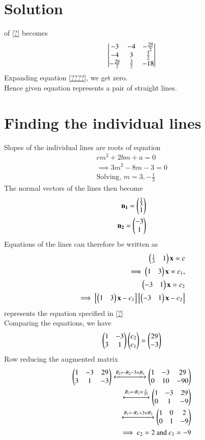 \documentclass[journal,12pt,twocolumn]{IEEEtran}
\begin{document}
\section{Solution}
 of \ref{?} becomes
\begin{align}
    \begin{vmatrix}-3&-4&-\frac{29}{2}\\-4&3&\frac{3}{2}\\-\frac{29}{2}&\frac{3}{2}&-18\end{vmatrix}\label{????}
\end{align}
Expanding equation \ref{????}, we get zero.\\
Hence given equation represents a pair of straight lines.
\section{Finding the individual lines}
Slopes of the individual lines are roots of equation 
\begin{align}
    cm^2+2bm+a=0\\
    \implies 3m^2-8m-3=0\\
    \text{Solving, }m=3,-\frac{1}{3}
\end{align}
The normal vectors of the lines then become
\begin{align}
    \mathbf{n_1}=\begin{pmatrix}\frac{1}{3}\\1\end{pmatrix}\\
    \mathbf{n_2}=\begin{pmatrix}-3\\1\end{pmatrix}
\end{align}
Equations of the lines can therefore be written as
\begin{align}
  \begin{pmatrix}\frac{1}{3}&1\end{pmatrix}\mathbf{x}=c\\
 \implies \begin{pmatrix}1&3\end{pmatrix}\mathbf{x}=c_1 ,\\
   \begin{pmatrix}-3&1\end{pmatrix}\mathbf{x}=c_2\\
  \implies \left[\begin{pmatrix}1&3\end{pmatrix}\mathbf{x}-c_1\right]\left[\begin{pmatrix}-3&1\end{pmatrix}\mathbf{x}-c_2\right]
\end{align}
represents the equation specified in \ref{?}\\
Comparing the equations, we have
\begin{align}
    \begin{pmatrix}1&-3\\3&1\end{pmatrix}\begin{pmatrix}c_2\\c_1\end{pmatrix}=\begin{pmatrix}29\\-3\end{pmatrix}\\
 \end{align}
 Row reducing the augmented matrix
 \begin{align}
    \begin{pmatrix}1&-3&29\\3&1&-3\end{pmatrix}\xleftrightarrow[]{R_2\leftarrow R_2-3\times R_1}
    \begin{pmatrix}1&-3&29\\0&10&-90\end{pmatrix}\\
    \xleftrightarrow[]{R_2\leftarrow R_2\times \frac{1}{10}}
    \begin{pmatrix}1&-3&29\\0&1&-9\end{pmatrix}\\
    \xleftrightarrow[]{R_1\leftarrow R_1+3\times R_2}
    \begin{pmatrix}1&0&2\\0&1&-9\end{pmatrix}\\
    \implies c_2=2 \text{ and }c_1=-9
\end{align}
\end{document}
